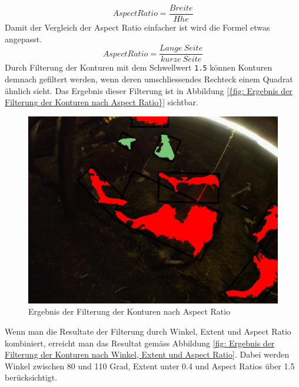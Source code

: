 \begin{equation}\label{Extent}
Aspect Ratio =  \frac{Breite}{H\ddot{}he}  
\end{equation}
Damit der Vergleich der Aspect Ratio einfacher ist wird die Formel etwas angepasst.
\begin{equation}\label{Extent}
Aspect Ratio =  \frac{Lange \ Seite}{kurze \ Seite}  
\end{equation}
Durch Filterung der Konturen mit dem Schwellwert \texttt{1.5} können Konturen demnach gefiltert werden, wenn deren umschliessendes Rechteck einem Quadrat ähnlich sieht. Das Ergebnis dieser Filterung ist in Abbildung \ref{{fig: Ergebnis der Filterung der Konturen nach Aspect Ratio}} sichtbar.
\begin{figure}[H]
	\center
	\includegraphics[scale=0.43]{Grafiken/entwicklung/27AspectRatio.jpg}
	\caption{Ergebnis der Filterung der Konturen nach Aspect Ratio } 
	\label{fig: Ergebnis der Filterung der Konturen nach Aspect Ratio} 
\end{figure}

Wenn man die Resultate der Filterung durch Winkel, Extent und Aspect Ratio kombiniert, erreicht man das Resultat gemäss Abbildung \ref{fig: Ergebnis der Filterung der Konturen nach Winkel, Extent und Aspect Ratio}. Dabei werden Winkel zwischen 80 und 110 Grad, Extent unter 0.4 und Aspect Ratios über 1.5 berücksichtigt.


